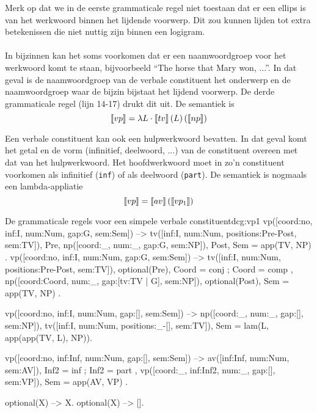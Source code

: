 Merk op dat we in de eerste grammaticale regel niet toestaan dat er een ellips is van het werkwoord binnen het lijdende voorwerp. Dit zou kunnen lijden tot extra betekenissen die niet nuttig zijn binnen een logigram.

\paragraph{} In bijzinnen kan het soms voorkomen dat er een naamwoordgroep voor het werkwoord komt te staan, bijvoorbeeld ``The horse that Mary won, ...''. In dat geval is de naamwoordgroep van de verbale constituent het onderwerp en de naamwoordgroep waar de bijzin bijstaat het lijdend voorwerp. De derde grammaticale regel (lijn 14-17) drukt dit uit. De semantiek is $$\llbracket vp\rrbracket = \lambda L \cdot \llbracket tv\rrbracket \left( L \right) \left( \llbracket np\rrbracket \right)$$

Een verbale constituent kan ook een hulpwerkwoord bevatten. In dat geval komt het getal en de vorm (infinitief, deelwoord, ...) van de constituent overeen met dat van het hulpwerkwoord. Het hoofdwerkwoord moet in zo'n constituent voorkomen als infinitief (\texttt{inf}) of als deelwoord (\texttt{part}). De semantiek is nogmaals een lambda-appliatie $$\llbracket vp\rrbracket = \llbracket av\rrbracket \left( \llbracket vp_1\rrbracket \right)$$

\begin{dcg}{De grammaticale regels voor een simpele verbale constituent}{dcg:vp1}
vp([coord:no, inf:I, num:Num, gap:G, sem:Sem]) -->
  tv([inf:I, num:Num, positions:Pre-Post, sem:TV]),
  Pre,
  np([coord:_, num:_, gap:G, sem:NP]),
  Post,
  { Sem = app(TV, NP) }.
vp([coord:no, inf:I, num:Num, gap:G, sem:Sem]) -->
  tv([inf:I, num:Num, positions:Pre-Post, sem:TV]),
  optional(Pre),
  { Coord = conj ; Coord = comp },
  np([coord:Coord, num:_, gap:[tv:TV | G], sem:NP]),
  optional(Post),
  { Sem = app(TV, NP) }.

vp([coord:no, inf:I, num:Num, gap:[], sem:Sem]) -->
  np([coord:_, num:_, gap:[], sem:NP]),
  tv([inf:I, num:Num, positions:_-[], sem:TV]),
  { Sem = lam(L, app(app(TV, L), NP))}.

vp([coord:no, inf:Inf, num:Num, gap:[], sem:Sem]) -->
  av([inf:Inf, num:Num, sem:AV]),
  { Inf2 = inf ; Inf2 = part },
  vp([coord:_, inf:Inf2, num:_, gap:[], sem:VP]),
  { Sem = app(AV, VP) }.

  
optional(X) -->
  X.
optional(X) -->
  [].
\end{dcg}

